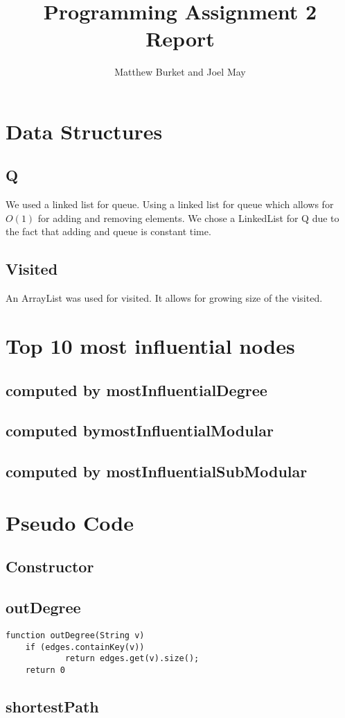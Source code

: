 \documentclass[10pt,letterpaper]{article}
\author{Matthew Burket and Joel May}
\title{Programming Assignment 2 Report}
\begin{document}
\maketitle
\section{Data Structures}
\subsection{Q}
We used a linked list for queue. Using a linked list for queue which allows for $O(1)$ for adding and removing elements. We chose a LinkedList for Q due to the fact that adding and queue is constant time.
\subsection{Visited}
An ArrayList was used for visited. It allows for growing size of the visited.
\section{Top 10 most influential nodes}
\subsection{computed by mostInfluentialDegree}
\subsection{computed bymostInfluentialModular}
\subsection{computed by mostInfluentialSubModular}
\section{Pseudo Code}
\subsection{Constructor}
\subsection{outDegree}
\begin{verbatim}
function outDegree(String v)
    if (edges.containKey(v))
			return edges.get(v).size();
	return 0
\end{verbatim}
\subsection{shortestPath}
\end{document}

